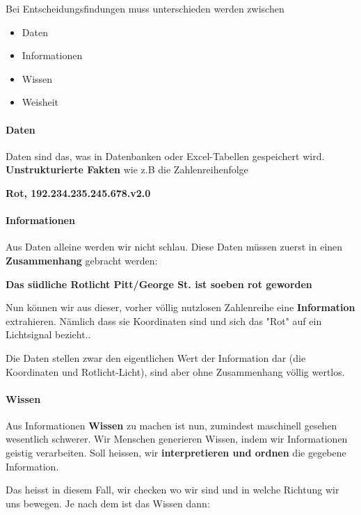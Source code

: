 \documentclass[a4paper, 11pt, nofootinbib]{article}
\begin{document}
Bei Entscheidungsfindungen muss unterschieden werden zwischen

\begin{itemize}
	\item Daten
	\item Informationen
	\item Wissen
	\item Weisheit
\end{itemize}

\paragraph{Daten}
Daten sind das, was in Datenbanken oder Excel-Tabellen gespeichert wird. \textbf{Unstrukturierte Fakten} wie z.B die Zahlenreihenfolge 
\begin{center}
\textbf{	Rot, 192.234.235.245.678.v2.0}
\end{center}

\paragraph{Informationen}
Aus Daten alleine werden wir nicht schlau. Diese Daten müssen zuerst in einen \textbf{Zusammenhang} gebracht werden:

\begin{center}
\textbf{	Das südliche Rotlicht Pitt/George St. ist soeben rot geworden }
\end{center}

Nun können wir aus dieser, vorher völlig nutzlosen Zahlenreihe eine \textbf{Information} extrahieren. Nämlich dass sie Koordinaten sind und sich das "Rot" auf ein Lichtsignal bezieht..

Die Daten stellen zwar den eigentlichen Wert der Information dar (die Koordinaten und Rotlicht-Licht), sind aber ohne Zusammenhang völlig wertlos.

\paragraph{Wissen}
Aus Informationen \textbf{Wissen} zu machen ist nun, zumindest maschinell gesehen wesentlich schwerer. Wir Menschen generieren Wissen, indem wir Informationen geistig verarbeiten. Soll heissen, wir \textbf{interpretieren und ordnen} die gegebene Information.

Das heisst in diesem Fall, wir checken wo wir sind und in welche Richtung wir uns bewegen. Je nach dem ist das Wissen dann:
\end{document}
